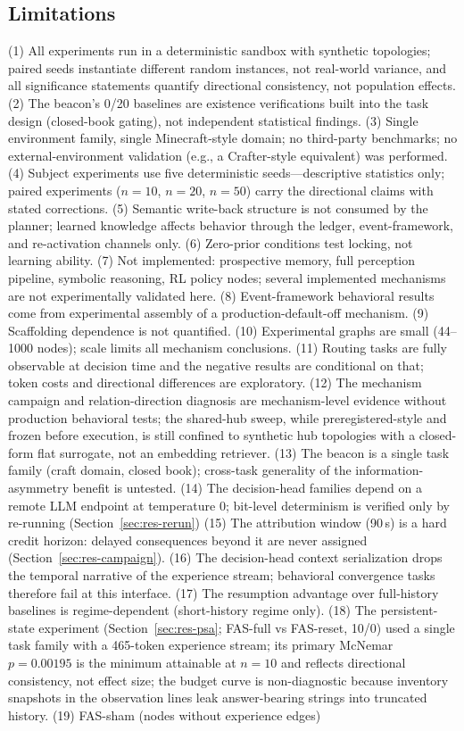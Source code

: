 \documentclass[10pt]{article}
\begin{document}
\subsection{Limitations}
\label{sec:limits}
(1) All experiments run in a deterministic sandbox with synthetic topologies; paired seeds instantiate different random instances, not real-world variance, and all significance statements quantify directional consistency, not population effects. (2) The beacon's 0/20 baselines are existence verifications built into the task design (closed-book gating), not independent statistical findings. (3) Single environment family, single Minecraft-style domain; no third-party benchmarks; no external-environment validation (e.g., a Crafter-style equivalent) was performed. (4) Subject experiments use five deterministic seeds---descriptive statistics only; paired experiments ($n{=}10$, $n{=}20$, $n{=}50$) carry the directional claims with stated corrections. (5) Semantic write-back structure is not consumed by the planner; learned knowledge affects behavior through the ledger, event-framework, and re-activation channels only. (6) Zero-prior conditions test locking, not learning ability. (7) Not implemented: prospective memory, full perception pipeline, symbolic reasoning, RL policy nodes; several implemented mechanisms are not experimentally validated here. (8) Event-framework behavioral results come from experimental assembly of a production-default-off mechanism. (9) Scaffolding dependence is not quantified. (10) Experimental graphs are small (44--1000 nodes); scale limits all mechanism conclusions. (11) Routing tasks are fully observable at decision time and the negative results are conditional on that; token costs and directional differences are exploratory. (12) The mechanism campaign and relation-direction diagnosis are mechanism-level evidence without production behavioral tests; the shared-hub sweep, while preregistered-style and frozen before execution, is still confined to synthetic hub topologies with a closed-form flat surrogate, not an embedding retriever. (13) The beacon is a single task family (craft domain, closed book); cross-task generality of the information-asymmetry benefit is untested. (14) The decision-head families depend on a remote LLM endpoint at temperature 0; bit-level determinism is verified only by re-running (Section~\ref{sec:res-rerun}) (15) The attribution window (90\,s) is a hard credit horizon: delayed consequences beyond it are never assigned (Section~\ref{sec:res-campaign}). (16) The decision-head context serialization drops the temporal narrative of the experience stream; behavioral convergence tasks therefore fail at this interface. (17) The resumption advantage over full-history baselines is regime-dependent (short-history regime only). (18) The persistent-state experiment (Section~\ref{sec:res-psa}; FAS-full vs FAS-reset, 10/0) used a single task family with a 465-token experience stream; its primary McNemar $p{=}0.00195$ is the minimum attainable at $n{=}10$ and reflects directional consistency, not effect size; the budget curve is non-diagnostic because inventory snapshots in the observation lines leak answer-bearing strings into truncated history. (19) FAS-sham (nodes without experience edges) 
\end{document}
